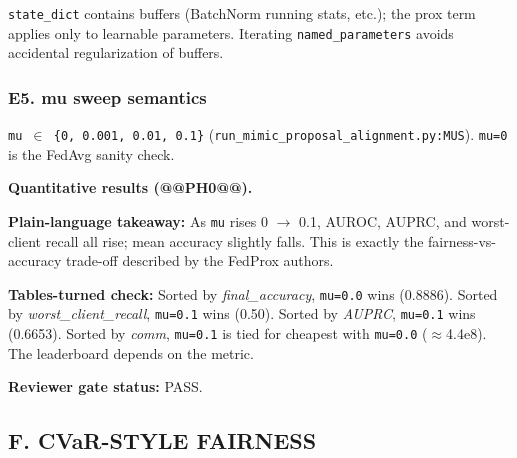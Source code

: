 \documentclass{article}
\begin{document}
\texttt{state\_dict} contains buffers (BatchNorm running stats, etc.); the prox term applies only to learnable parameters. Iterating \texttt{named\_parameters} avoids accidental regularization of buffers.


\subsubsection{E5. mu sweep semantics}


\texttt{mu \ensuremath{\in} \{0, 0.001, 0.01, 0.1\}} (\texttt{run\_mimic\_proposal\_alignment.py:MUS}). \texttt{mu=0} is the FedAvg sanity check.


\textbf{Quantitative results (@@PH0@@).}


\begin{table}[H]
  \centering
  \scriptsize
\end{table}


\textbf{Plain-language takeaway:} As \texttt{mu} rises 0 \ensuremath{\rightarrow} 0.1, AUROC, AUPRC, and worst-client recall all rise; mean accuracy slightly falls. This is exactly the fairness-vs-accuracy trade-off described by the FedProx authors.


\textbf{Tables-turned check:} Sorted by \emph{final\_accuracy}, \texttt{mu=0.0} wins (0.8886). Sorted by \emph{worst\_client\_recall}, \texttt{mu=0.1} wins (0.50). Sorted by \emph{AUPRC}, \texttt{mu=0.1} wins (0.6653). Sorted by \emph{comm}, \texttt{mu=0.1} is tied for cheapest with \texttt{mu=0.0} (\ensuremath{\approx}4.4e8). The leaderboard depends on the metric.


\textbf{Reviewer gate status:} PASS.


\subsection{F. CVaR-STYLE FAIRNESS}
\end{document}

